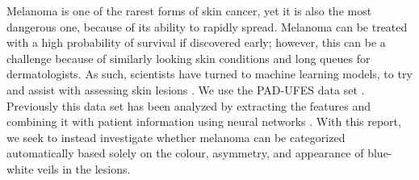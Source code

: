 Melanoma is one of the rarest forms of skin cancer, yet it is also the most dangerous one, because of its ability to rapidly spread.
\newline
Melanoma can be treated with a high probability of survival if discovered early; however, this can be a challenge because of similarly looking skin conditions and long queues for dermatologists. As such, scientists have turned to machine learning models, to try and assist with assessing skin lesions \cite{SCF_Melanoma}.
\newline
We use the PAD-UFES data set \cite{pacheco2020padufes}. Previously this data set has been analyzed by extracting the features and combining it with patient information using neural networks \cite{PACHECO2020103545}. With this report, we seek to instead investigate whether melanoma can be categorized automatically based solely on the colour, asymmetry, and appearance of blue-white veils in the lesions.
